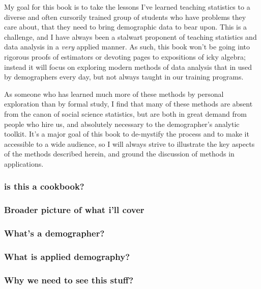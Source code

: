 \documentclass[
]{article}
\begin{document}
My goal for this book is to take the lessons I've learned teaching statistics to a diverse and often cursorily trained group of students who have problems they care about, that they need to bring demographic data to bear upon. This is a challenge, and I have always been a stalwart proponent of teaching statistics and data analysis in a \emph{very} applied manner. As such, this book won't be going into rigorous proofs of estimators or devoting pages to expositions of icky algebra; instead it will focus on exploring modern methods of data analysis that in used by demographers every day, but not always taught in our training programs.

As someone who has learned much more of these methods by personal exploration than by formal study, I find that many of these methods are absent from the canon of social science statistics, but are both in great demand from people who hire us, and absolutely necessary to the demographer's analytic toolkit. It's a major goal of this book to de-mystify the process and to make it accessible to a wide audience, so I will always strive to illustrate the key aspects of the methods described herein, and ground the discussion of methods in applications.

\hypertarget{is-this-a-cookbook}{%
\subsubsection{is this a cookbook?}\label{is-this-a-cookbook}}

\hypertarget{broader-picture-of-what-ill-cover}{%
\subsubsection{Broader picture of what i'll cover}\label{broader-picture-of-what-ill-cover}}

\hypertarget{whats-a-demographer}{%
\subsubsection{What's a demographer?}\label{whats-a-demographer}}

\hypertarget{what-is-applied-demography}{%
\subsubsection{What is applied demography?}\label{what-is-applied-demography}}

\hypertarget{why-we-need-to-see-this-stuff}{%
\subsubsection{Why we need to see this stuff?}\label{why-we-need-to-see-this-stuff}}
\end{document}

